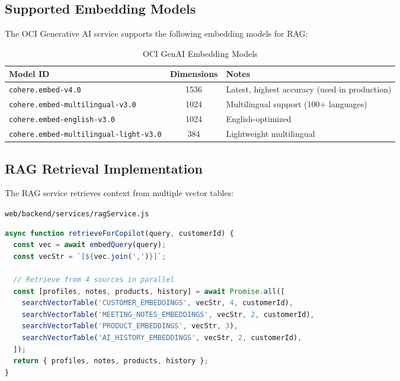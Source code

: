 \documentclass[12pt,a4paper]{article}
\begin{document}
\subsection{Supported Embedding Models}

The OCI Generative AI service supports the following embedding models for RAG:

\begin{table}[H]
\centering
\caption{OCI GenAI Embedding Models}
\begin{tabularx}{\textwidth}{l c X}
\toprule
\textbf{Model ID} & \textbf{Dimensions} & \textbf{Notes} \\
\midrule
\texttt{cohere.embed-v4.0} & 1536 & Latest, highest accuracy (used in production) \\
\texttt{cohere.embed-multilingual-v3.0} & 1024 & Multilingual support (100+ languages) \\
\texttt{cohere.embed-english-v3.0} & 1024 & English-optimized \\
\texttt{cohere.embed-multilingual-light-v3.0} & 384 & Lightweight multilingual \\
\bottomrule
\end{tabularx}
\end{table}

\subsection{RAG Retrieval Implementation}

The RAG service retrieves context from multiple vector tables:

\texttt{web/backend/services/ragService.js}

\begin{lstlisting}[language=JavaScript, caption={Multi-source RAG retrieval (simplified)}]
async function retrieveForCopilot(query, customerId) {
  const vec = await embedQuery(query);
  const vecStr = `[${vec.join(',')}]`;

  // Retrieve from 4 sources in parallel
  const [profiles, notes, products, history] = await Promise.all([
    searchVectorTable('CUSTOMER_EMBEDDINGS', vecStr, 4, customerId),
    searchVectorTable('MEETING_NOTES_EMBEDDINGS', vecStr, 2, customerId),
    searchVectorTable('PRODUCT_EMBEDDINGS', vecStr, 3),
    searchVectorTable('AI_HISTORY_EMBEDDINGS', vecStr, 2, customerId),
  ]);
  return { profiles, notes, products, history };
}
\end{lstlisting}
\end{document}
